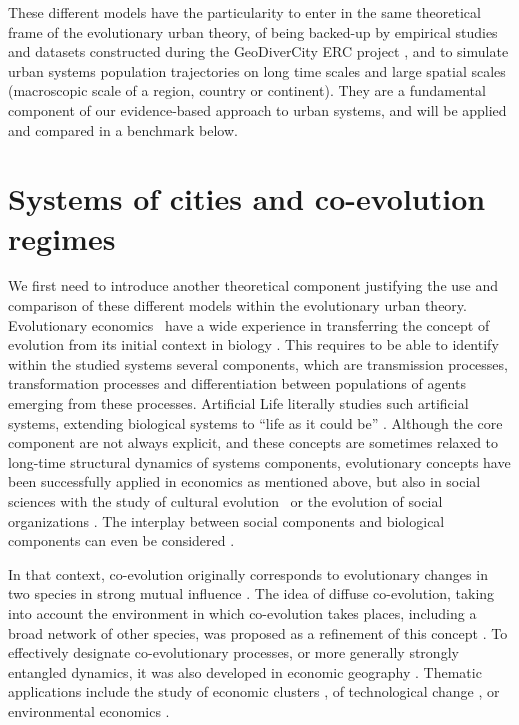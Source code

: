 \documentclass[11pt]{article}
\begin{document}
These different models have the particularity to enter in the same theoretical frame of the evolutionary urban theory, of being backed-up by empirical studies and datasets constructed during the GeoDiverCity ERC project \cite{pumain2015multilevel}, and to simulate urban systems population trajectories on long time scales and large spatial scales (macroscopic scale of a region, country or continent). They are a fundamental component of our evidence-based approach to urban systems, and will be applied and compared in a benchmark below.

\section{Systems of cities and co-evolution regimes}


We first need to introduce another theoretical component justifying the use and comparison of these different models within the evolutionary urban theory. Evolutionary economics~\cite{nelson2009evolutionary} have a wide experience in transferring the concept of evolution from its initial context in biology \cite{durham1991coevolution}. This requires to be able to identify within the studied systems several components, which are transmission processes, transformation processes and differentiation between populations of agents emerging from these processes. Artificial Life literally studies such artificial systems, extending biological systems to ``life as it could be'' \cite{langton1997artificial,bedau2003artificial}. Although the core component are not always explicit, and these concepts are sometimes relaxed to long-time structural dynamics of systems components, evolutionary concepts have been successfully applied in economics as mentioned above, but also in social sciences with the study of cultural evolution~\cite{mesoudi2017pursuing} or the evolution of social organizations \cite{volberda2003co}. The interplay between social components and biological components can even be considered \cite{bull2000meme}.

In that context, co-evolution originally corresponds to evolutionary changes in two species in strong mutual influence \cite{janzen1980coevolution}. The idea of diffuse co-evolution, taking into account the environment in which co-evolution takes places, including a broad network of other species, was proposed as a refinement of this concept \cite{strauss2005toward}. To effectively designate co-evolutionary processes, or more generally strongly entangled dynamics, it was also developed in economic geography \cite{schamp2010notion}. Thematic applications include the study of economic clusters \cite{ter2011co}, of technological change \cite{colletis2010co}, or environmental economics \cite{kallis2007coevolution}.
\end{document}
